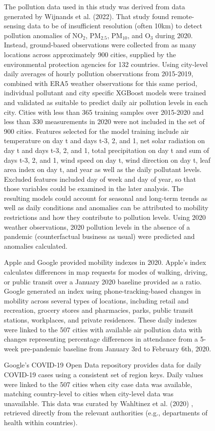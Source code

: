 \documentclass[preprint,10pt]{elsarticle} %
\begin{document}
{\begin{figure}
{{The pollution data used in this study was derived from data generated by Wijnands et al. (2022)\cite{Wijnands2022}. That study found remote-sensing data to be of insufficient resolution (often 10km) to detect pollution anomalies of NO$_{2}$, PM$_{2.5}$, PM$_{10}$, and O$_{3}$ during 2020. Instead, ground-based observations were collected from as many locations across approximately 900 cities, supplied by the environmental protection agencies for 132 countries.  Using city-level daily averages of hourly pollution observations from 2015-2019, combined with ERA5\cite{Hersbach2020} weather observations for this same period, individual pollutant and city specific XGBoost models were trained and validated as suitable to predict daily air pollution levels in each city. Cities with less than 365 training samples over 2015-2020 and less than 330 measurements in 2020 were not included in the set of 900 cities. Features selected for the model training include air temperature on day t and days t-3, 2, and 1, net solar radiation on day t and days t-3, 2, and 1, total precipitation on day t and sum of days t-3, 2, and 1, wind speed on day t, wind direction on day t, leaf area index on day t, and year as well as the daily pollutant levels. Excluded features included day of week and day of year, so that those variables could be examined in the later analysis. The resulting models could account for seasonal and long-term trends as well as daily conditions and anomalies can be attributed to mobility restrictions and how they contribute to pollution levels. Using 2020 weather observations, 2020 pollution levels in the absence of a pandemic (counterfactual business as usual) were predicted and anomalies calculated. 

Apple\cite{Apple2020} and Google\cite{Google2020} provided mobility indexes in 2020. Apple's index calculates differences in map requests for modes of walking, driving, or public transit over a January 2020 baseline provided as a ratio. Google generated an index using phone-tracking-based changes in mobility across several types of locations, including retail and recreation, grocery stores and pharmacies, parks, public transit stations, workplaces, and private residences. These daily indexes were linked to the 507 cities with available air pollution data with changes representing percentage differences in attendance from a 5-week pre-pandemic baseline from January 3rd to February 6th, 2020\cite{owidcoronavirus}.

Google's COVID-19 Open Data repository\cite{Google2022} provides data for daily COVID-19 cases using a consistent set of region keys. Daily values were linked to the 507 cities when city case data was available, matching country-level to cities when city-level data was unavailable. This data was curated by Wahltinez et al. (2020) \citep{Wahltinez2020}, retrieved directly from the relevant authorities (e.g., departments of health within countries).

}}
\end{figure}}
\end{document}
